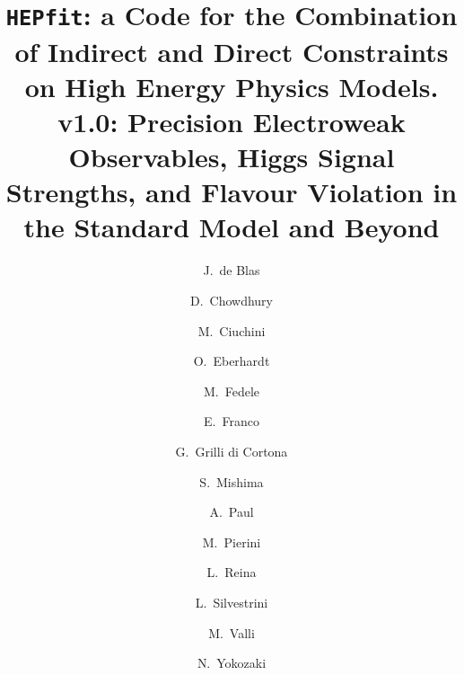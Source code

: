 \documentclass[preprint,3p,12pt]{elsarticle}
\newcommand{\HEPfit}{\texttt{HEPfit}\xspace}
\begin{document}
\begin{frontmatter}



\title{\HEPfit: a Code for the Combination of Indirect and Direct
  Constraints on High Energy Physics Models.\\
  v1.0: Precision Electroweak Observables, Higgs Signal Strengths, and Flavour Violation in the
  Standard Model and Beyond}

\author[a]{J.~de Blas}
\author[a]{D.~Chowdhury}
\author[b]{M.~Ciuchini}
\author[a]{O.~Eberhardt}
\author[a]{M.~Fedele}
\author[a]{E.~Franco}
\author[c]{G.~Grilli di Cortona}
\author[d]{S.~Mishima}
\author[a]{A.~Paul}
\author[e]{M.~Pierini}
\author[f]{L.~Reina}
\author[a]{L.~Silvestrini}
\author[g]{M.~Valli}
\author[h]{N.~Yokozaki}

\address[a]{INFN, Sezione di Roma, Piazzale A. Moro 2, I-00185 Roma, Italy}
\address[b]{INFN,  Sezione di Roma Tre, Via della Vasca Navale 84, I-00146 Roma, Italy}
\address[c]{Sao Paolo, Brazil}
\address[d]{Institute of Particle and Nuclear Studies, KEK, Tsukuba 305-0801, Japan}
\address[e]{CERN}
\address[f]{Physics Department, Florida State University, Tallahassee, FL 32306-4350, USA}
\address[g]{SISSA, via Bonomea 265, I-34136 Trieste, Italy and INFN, Sezione di Trieste, via Valerio 2, I-34127 Trieste, Italy}
\address[h]{Department of Physics, Tohoku University, Sendai, Miyagi 980-8578, Japan}



\end{frontmatter}
\end{document}
